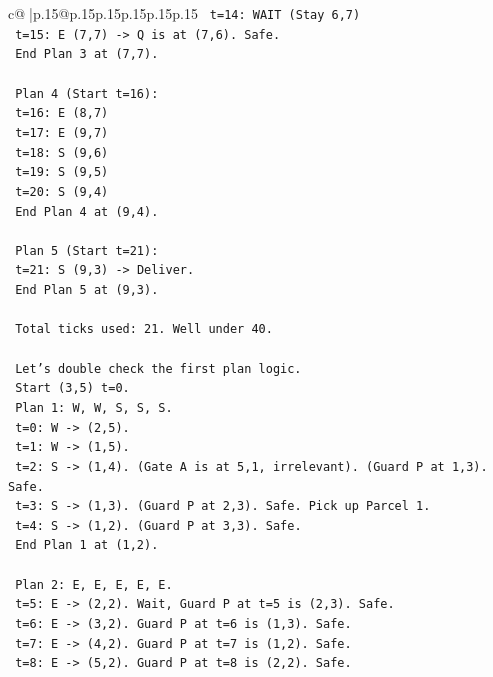 \documentclass{article}
\begin{document}
{\begin{supertabular}{c@{$\;$}|p{.15\linewidth}@{}p{.15\linewidth}p{.15\linewidth}p{.15\linewidth}p{.15\linewidth}p{.15\linewidth}}
{{{\texttt{   t=14: WAIT (Stay 6,7)} \\
\texttt{   t=15: E (7,7) {-}> Q is at (7,6). Safe.} \\
\texttt{   End Plan 3 at (7,7).} \\
\\ 
\texttt{   Plan 4 (Start t=16):} \\
\texttt{   t=16: E (8,7)} \\
\texttt{   t=17: E (9,7)} \\
\texttt{   t=18: S (9,6)} \\
\texttt{   t=19: S (9,5)} \\
\texttt{   t=20: S (9,4)} \\
\texttt{   End Plan 4 at (9,4).} \\
\\ 
\texttt{   Plan 5 (Start t=21):} \\
\texttt{   t=21: S (9,3) {-}> Deliver.} \\
\texttt{   End Plan 5 at (9,3).} \\
\\ 
\texttt{   Total ticks used: 21. Well under 40.} \\
\\ 
\texttt{   Let's double check the first plan logic.} \\
\texttt{   Start (3,5) t=0.} \\
\texttt{   Plan 1: W, W, S, S, S.} \\
\texttt{   t=0: W {-}> (2,5).} \\
\texttt{   t=1: W {-}> (1,5).} \\
\texttt{   t=2: S {-}> (1,4). (Gate A is at 5,1, irrelevant). (Guard P at 1,3). Safe.} \\
\texttt{   t=3: S {-}> (1,3). (Guard P at 2,3). Safe. Pick up Parcel 1.} \\
\texttt{   t=4: S {-}> (1,2). (Guard P at 3,3). Safe.} \\
\texttt{   End Plan 1 at (1,2).} \\
\\ 
\texttt{   Plan 2: E, E, E, E, E.} \\
\texttt{   t=5: E {-}> (2,2). Wait, Guard P at t=5 is (2,3). Safe.} \\
\texttt{   t=6: E {-}> (3,2). Guard P at t=6 is (1,3). Safe.} \\
\texttt{   t=7: E {-}> (4,2). Guard P at t=7 is (1,2). Safe.} \\
\texttt{   t=8: E {-}> (5,2). Guard P at t=8 is (2,2). Safe.} \\
}}}
\end{supertabular}}
\end{document}
